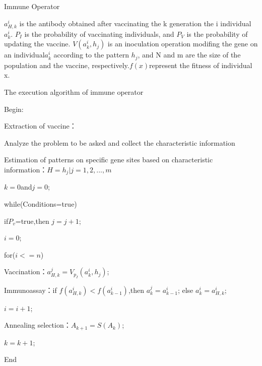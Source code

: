 \begin{frame}{Immune Operator}
 
 \indent 
$a_{H,k}^i$ is the antibody obtained after vaccinating the k generation the i individual $a_k^i$. $P_I$ is the probability of vaccinating individuals, and $P_V$ is the probability of updating the vaccine. $V(a_k^i,h_j)$ is an inoculation operation modifing the gene on an individual$a_k^i$ according to the pattern $h_j$,  and N and m are the size of the population and the vaccine, respectively.$f(x)$represent the fitness of individual x.
 
 

\par\setlength\parindent{6em}

\end{frame}

\begin{frame}{The execution algorithm of immune operator}
 
  \par\setlength\parindent{6em}
Begin:
\par\setlength\parindent{6em}
  \small Extraction of vaccine：
  \par\setlength\parindent{8em}
  Analyze the problem to be asked and collect the characteristic information
  \par\setlength\parindent{8em}
  Estimation of patterns on specific gene sites based on characteristic information：$H={h_j|j=1,2,...,m}$
   \par\setlength\parindent{6em}
   $k=0$and$j=0$;
   \par\setlength\parindent{6em}
   while(Conditions=true)
   \par\setlength\parindent{7em}
    if{$P_v$}=true,then $j=j+1$;
    \par\setlength\parindent{7em}
    $i=0$;
    \par\setlength\parindent{7em}
    for($i<=n$)
    \par\setlength\parindent{8em}
    Vaccination：$a_{H,k}^j=V_{p_I}{(a_k^i,h_j)}$;
    \par\setlength\parindent{8em}
    Immunoassay：if $f(a_{H,k}^i)<f(a_{k-1}^i)$,then $a_k^j=a_{k-1}^i$;
    else $a_k^i=a_{H,k}^i$;
    \par\setlength\parindent{8em}
    $i=i+1$;
    \par\setlength\parindent{7em}
    Annealing selection：$A_{k+1}=S(A_k)$;
    \par\setlength\parindent{7em}
    $k=k+1$;
    
    End
  
\end{frame}





